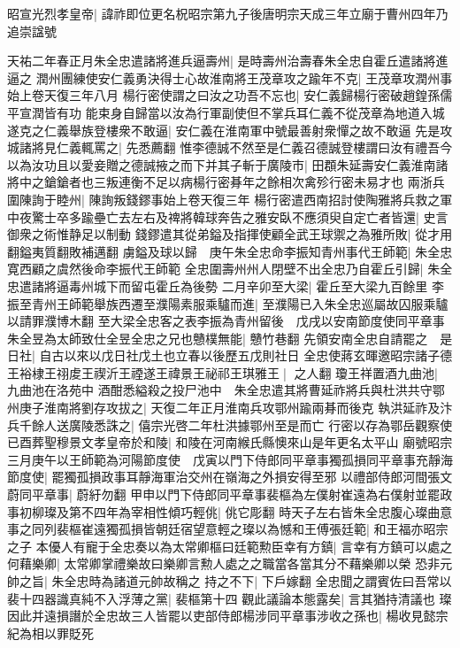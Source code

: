昭宣光烈孝皇帝|{
	諱祚即位更名柷昭宗第九子後唐明宗天成三年立廟于曹州四年乃追崇諡號}


天祐二年春正月朱全忠遣諸將進兵逼壽州|{
	是時壽州治壽春朱全忠自霍丘遣諸將進逼之}
潤州團練使安仁義勇決得士心故淮南將王茂章攻之踰年不克|{
	王茂章攻潤州事始上卷天復三年八月}
楊行密使謂之曰汝之功吾不忘也|{
	安仁義歸楊行密破趙鍠孫儒平宣潤皆有功}
能束身自歸當以汝為行軍副使但不掌兵耳仁義不從茂章為地道入城遂克之仁義舉族登樓衆不敢逼|{
	安仁義在淮南軍中號最善射衆憚之故不敢逼}
先是攻城諸將見仁義輒罵之|{
	先悉薦翻}
惟李德誠不然至是仁義召德誠登樓謂曰汝有禮吾今以為汝功且以愛妾贈之德誠掖之而下并其子斬于廣陵市|{
	田頵朱延壽安仁義淮南諸將中之鎗鎗者也三叛連衡不足以病楊行密朞年之餘相次禽殄行密未易才也}
兩浙兵圍陳詢于睦州|{
	陳詢叛錢鏐事始上卷天復三年}
楊行密遣西南招討使陶雅將兵救之軍中夜驚士卒多踰壘亡去左右及禆將韓球奔告之雅安臥不應須臾自定亡者皆還|{
	史言御衆之術惟静足以制動}
錢鏐遣其從弟鎰及指揮使顧全武王球禦之為雅所敗|{
	從才用翻鎰夷質翻敗補邁翻}
虜鎰及球以歸　庚午朱全忠命李振知青州事代王師範|{
	朱全忠寛西顧之虞然後命李振代王師範}
全忠圍壽州州人閉壁不出全忠乃自霍丘引歸|{
	朱全忠遣諸將逼毒州城下而留屯霍丘為後勢}
二月辛卯至大梁|{
	霍丘至大梁九百餘里}
李振至青州王師範舉族西遷至濮陽素服乘驢而進|{
	至濮陽已入朱全忠巡屬故囚服乘驢以請罪濮博木翻}
至大梁全忠客之表李振為青州留後　戊戌以安南節度使同平章事朱全昱為太師致仕全昱全忠之兄也戇樸無能|{
	戇竹巷翻}
先領安南全忠自請罷之　是日社|{
	自古以來以戊日社戊土也立春以後歷五戊則社日}
全忠使蔣玄暉邀昭宗諸子德王裕棣王祤䖍王禊沂王禋遂王禕景王祕祁王琪雅王|{
	之人翻}
瓊王祥置酒九曲池|{
	九曲池在洛苑中}
酒酣悉縊殺之投尸池中　朱全忠遣其將曹延祚將兵與杜洪共守鄂州庚子淮南將劉存攻拔之|{
	天復二年正月淮南兵攻鄂州踰兩朞而後克}
執洪延祚及汴兵千餘人送廣陵悉誅之|{
	僖宗光啓二年杜洪據鄂州至是而亡}
行密以存為鄂岳觀察使　已酉葬聖穆景文孝皇帝於和陵|{
	和陵在河南緱氏縣懊來山是年更名太平山}
廟號昭宗　三月庚午以王師範為河陽節度使　戊寅以門下侍郎同平章事獨孤損同平章事充靜海節度使|{
	罷獨孤損政事耳靜海軍治交州在嶺海之外損安得至邪}
以禮部侍郎河間張文蔚同平章事|{
	蔚紆勿翻}
甲申以門下侍郎同平章事裴樞為左僕射崔遠為右僕射並罷政事初柳璨及第不四年為宰相性傾巧輕佻|{
	佻它彫翻}
時天子左右皆朱全忠腹心璨曲意事之同列裴樞崔遠獨孤損皆朝廷宿望意輕之璨以為憾和王傅張廷範|{
	和王福亦昭宗之子}
本優人有寵于全忠奏以為太常卿樞曰廷範勲臣幸有方鎮|{
	言幸有方鎮可以處之}
何藉樂卿|{
	太常卿掌禮樂故曰樂卿言勲人處之之職當各當其分不藉樂卿以榮}
恐非元帥之旨|{
	朱全忠時為諸道元帥故稱之}
持之不下|{
	下戶嫁翻}
全忠聞之謂賓佐曰吾常以裴十四器識真純不入浮薄之黨|{
	裴樞第十四}
觀此議論本態露矣|{
	言其猶持清議也}
璨因此并遠損譖於全忠故三人皆罷以吏部侍郎楊涉同平章事涉收之孫也|{
	楊收見懿宗紀為相以罪貶死}
